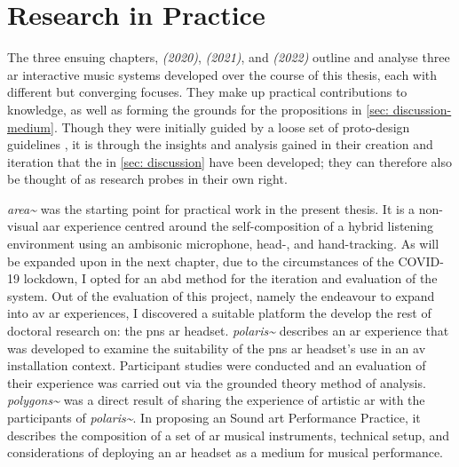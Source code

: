 \section{Research in Practice}
The three ensuing chapters, \textit{ (2020)}, \textit{ (2021)}, and \textit{ (2022)} outline and analyse three \gls{ar} interactive music systems developed over the course of this thesis, each with different but converging focuses. They make up practical contributions to knowledge, as well as forming the grounds for the propositions in \autoref{sec: discussion-medium}. Though they were initially guided by a loose set of proto-design guidelines \citep{bilbow2020}, it is through the insights and analysis gained in their creation and iteration that the  in \autoref{sec: discussion} have been developed; they can therefore also be thought of as research probes in their own right.

\textit{area\textasciitilde{}} was the starting point for practical work in the present thesis. It is a non-visual \gls{aar} experience centred around the self-composition of a hybrid listening environment using an ambisonic microphone, head-, and hand-tracking. As will be expanded upon in the next chapter, due to the circumstances of the COVID-19 lockdown, I opted for an \gls{abd} method for the iteration and evaluation of the system. Out of the evaluation of this project, namely the endeavour to expand into \gls{av} \gls{ar} experiences, I discovered a suitable platform the develop the rest of doctoral research on: the  \gls{pns} \gls{ar} headset. \textit{polaris\textasciitilde{}} describes an \gls{ar} experience that was developed to examine the suitability of the \gls{pns} \gls{ar} headset's use in an \gls{av} installation context. Participant studies were conducted and an evaluation of their experience was carried out via the grounded theory method of analysis. \textit{polygons\textasciitilde{}} was a direct result of sharing the experience of artistic \gls{ar} with the participants of \textit{polaris\textasciitilde{}}. In proposing an Sound \gls{art} Performance Practice, it describes the composition of a set of \gls{ar} musical instruments, technical setup, and considerations of deploying an \gls{ar} headset as a medium for musical performance.


